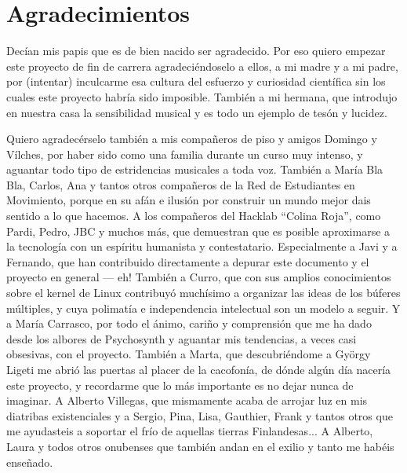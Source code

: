 



\thispagestyle{empty}

\chapter*{Agradecimientos}

Decían mis papis que es de bien nacido ser agradecido. Por eso quiero
empezar este proyecto de fin de carrera agradeciéndoselo a ellos, a mi
madre y a mi padre, por (intentar) inculcarme esa cultura del esfuerzo
y curiosidad científica sin los cuales este proyecto habría sido
imposible. También a mi hermana, que introdujo en nuestra casa la
sensibilidad musical y es todo un ejemplo de tesón y lucidez.

Quiero agradecérselo también a mis compañeros de piso y amigos Domingo
y Vílches, por haber sido como una familia durante un curso muy
intenso, y aguantar todo tipo de estridencias musicales a toda
voz. También a María Bla Bla, Carlos, Ana y tantos otros compañeros de
la Red de Estudiantes en Movimiento, porque en su afán e ilusión por
construir un mundo mejor dais sentido a lo que hacemos. A los
compañeros del Hacklab ``Colina Roja'', como Pardi, Pedro, JBC y
muchos más, que demuestran que es posible aproximarse a la tecnología
con un espíritu humanista y contestatario. Especialmente a Javi y a
Fernando, que han contribuido directamente a depurar este documento y
el proyecto en general --- eh! También a Curro, que con sus amplios
conocimientos sobre el kernel de Linux contribuyó muchísimo a
organizar las ideas de los búferes múltiples, y cuya polimatía e
independencia intelectual son un modelo a seguir. Y a María Carrasco,
por todo el ánimo, cariño y comprensión que me ha dado desde los
albores de Psychosynth y aguantar mis tendencias, a veces casi
obsesivas, con el proyecto. También a Marta, que descubriéndome a
György Ligeti me abrió las puertas al placer de la cacofonía, de dónde
algún día nacería este proyecto, y recordarme que lo más importante es
no dejar nunca de imaginar. A Alberto Villegas, que mismamente acaba
de arrojar luz en mis diatribas existenciales y a Sergio, Pina,
Lisa, Gauthier, Frank y tantos otros que me ayudasteis a soportar el
frío de aquellas tierras Finlandesas... A Alberto, Laura y todos
otros onubenses que también andan en el exilio y tanto me habéis
enseñado.

